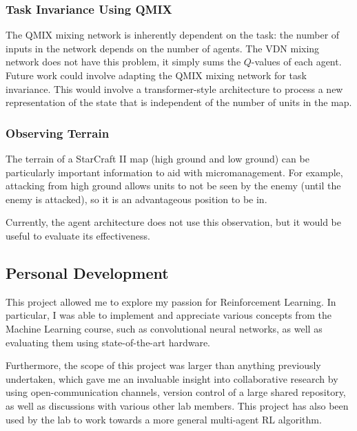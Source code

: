 \subsubsection{Task Invariance Using QMIX}

The QMIX mixing network is inherently dependent on the task: the number of inputs in the network depends on the number of agents. The VDN mixing network does not have this problem, it simply sums the $Q$-values of each agent. Future work could involve adapting the QMIX mixing network for task invariance. This would involve a transformer-style architecture to process a new representation of the state that is independent of the number of units in the map.


\subsubsection{Observing Terrain}

The terrain of a StarCraft II map (high ground and low ground) can be particularly important information to aid with micromanagement. For example, attacking from high ground allows units to not be seen by the enemy (until the enemy is attacked), so it is an advantageous position to be in.

Currently, the agent architecture does not use this observation, but it would be useful to evaluate its effectiveness.


\subsection{Personal Development}
This project allowed me to explore my passion for Reinforcement Learning. In particular, I was able to implement and appreciate various concepts from the Machine Learning course, such as convolutional neural networks, as well as evaluating them using state-of-the-art hardware.

Furthermore, the scope of this project was larger than anything previously undertaken, which gave me an invaluable insight into collaborative research by using open-communication channels, version control of a large shared repository, as well as discussions with various other lab members. This project has also been used by the lab to work towards a more general multi-agent RL algorithm.
